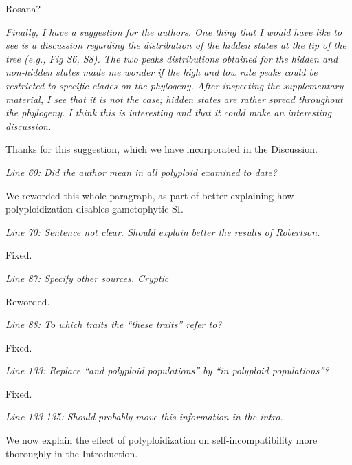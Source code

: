 \documentclass[11pt]{article}
\renewenvironment{quote}{\bigskip\noindent\itshape\ignorespaces}{\smallskip}
\begin{document}
Rosana? %

\begin{quote}
Finally, I have a suggestion for the authors.
One thing that I would have like to see is a discussion regarding the distribution of the hidden states at the tip of the tree (e.g., Fig S6, S8).
The two peaks distributions obtained for the hidden and non-hidden states made me wonder if the high and low rate peaks could be restricted to specific clades on the phylogeny.
After inspecting the supplementary material, I see that it is not the case; hidden states are rather spread throughout the phylogeny.
I think this is interesting and that it could make an interesting discussion.
\end{quote}

Thanks for this suggestion, which we have incorporated in the Discussion. %


\begin{quote}
Line 60: Did the author mean in all polyploid examined to date?
\end{quote}

We reworded this whole paragraph, as part of better explaining how polyploidization disables gametophytic SI.

\begin{quote}
Line 70: Sentence not clear. Should explain better the results of Robertson.
\end{quote}

Fixed.

\begin{quote}
Line 87: Specify other sources. Cryptic
\end{quote}

Reworded.

\begin{quote}
Line 88: To which traits the ``these traits'' refer to?
\end{quote}

Fixed.

\begin{quote}
Line 133: Replace ``and polyploid populations'' by ``in polyploid populations''?
\end{quote}

Fixed.

\begin{quote}
Line 133-135: Should probably move this information in the intro.
\end{quote}

We now explain the effect of polyploidization on self-incompatibility more thoroughly in the Introduction.
\end{document}
